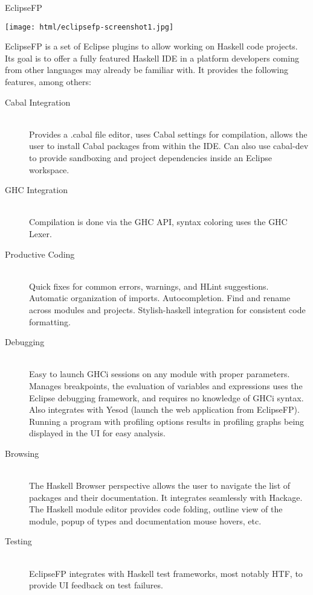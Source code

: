 \begin{hcarentry}[updated]{EclipseFP}
\makeheader

\begin{center}
\texttt{[image: html/eclipsefp-screenshot1.jpg]}
\end{center}

EclipseFP is a set of Eclipse plugins to allow working on Haskell code projects. Its goal is to offer a fully featured Haskell IDE in a platform developers coming from other languages may already be familiar with. It provides the following features, among others:

\begin{description}
  \item[Cabal Integration] \hfill \\
  Provides a .cabal file editor, uses Cabal settings for compilation, allows the user to install Cabal packages from within the IDE. Can also use cabal-dev to provide sandboxing and project dependencies inside an Eclipse workspace.
  \item[GHC Integration] \hfill \\
  Compilation is done via the GHC API, syntax coloring uses the GHC Lexer.
  \item[Productive Coding] \hfill \\
  Quick fixes for common errors, warnings, and HLint suggestions. Automatic organization of imports. Autocompletion. Find and rename across modules and projects. Stylish-haskell integration for consistent code formatting.
  \item[Debugging] \hfill \\
  Easy to launch GHCi sessions on any module with proper parameters. Manages breakpoints, the evaluation of variables and expressions uses the Eclipse debugging framework, and requires no knowledge of GHCi syntax. Also integrates with Yesod (launch the web application from EclipseFP). Running a program with profiling options results in profiling graphs being displayed in the UI for easy analysis.
  \item[Browsing] \hfill \\
  The Haskell Browser perspective allows the user to navigate the list of packages and their documentation. It integrates seamlessly with Hackage. The Haskell module editor provides code folding, outline view of the module, popup of types and documentation mouse hovers, etc.
  \item[Testing] \hfill \\
  EclipseFP integrates with Haskell test frameworks, most notably HTF, to provide UI feedback on test failures.
\end{description}


\end{hcarentry}
